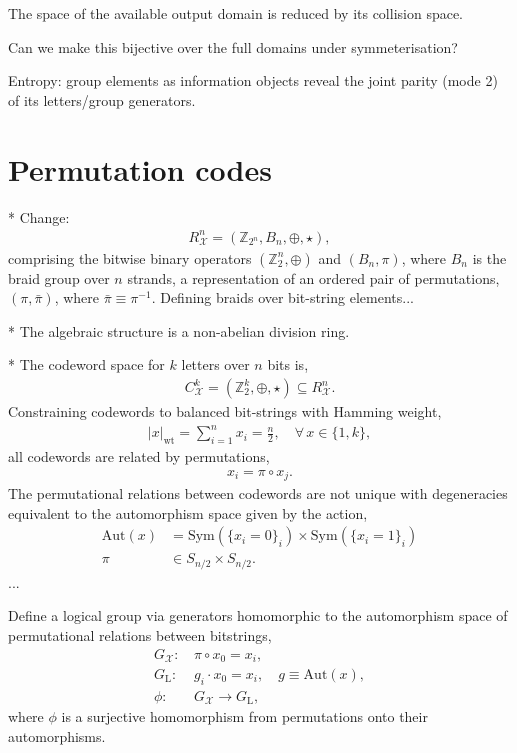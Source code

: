 \documentclass[twocolumn, aps, amsmath, amssymb, nofootinbib, superscriptaddress, longbibliography, doublefloatfix, table-of-contents, eqsecnum, rmp]{revtex4-2}
\begin{document}
The space of the available output domain is reduced by its collision space.

Can we make this bijective over the full domains under symmeterisation?

Entropy: group elements as information objects reveal the joint parity (mode 2) of its letters/group generators.


\section{Permutation codes}

* Change:
\begin{align}
	R_\mathcal{X}^n = (\mathbb{Z}_{2^n}, B_n, \oplus, \star),
\end{align}
comprising the bitwise binary operators $(\mathbb{Z}_2^n,\oplus)$ and $(B_n,\pi)$, where $B_n$ is the braid group over $n$ strands, a representation of an ordered pair of permutations, $(\pi,\bar{\pi})$, where $\bar{\pi}\equiv \pi^{-1}$. Defining braids over bit-string elements...

* The algebraic structure is a non-abelian division ring.

* The codeword space for $k$ letters over $n$ bits is,
\begin{align}
	C_\mathcal{X}^k = (\mathbb{Z}_2^k,\oplus,\star) \subseteq R_\mathcal{X}^n.
\end{align}
Constraining codewords to balanced bit-strings with Hamming weight,
\begin{align}
	|x|_\mathrm{wt} = \sum_{i=1}^n x_i = \frac{n}{2},\quad\forall\, x\in\{1,k\},
\end{align}
all codewords are related by permutations,
\begin{align}
	x_i = \pi \circ x_j.
\end{align}
The permutational relations between codewords are not unique with degeneracies equivalent to the automorphism space given by the action,
\begin{align}
	\mathrm{Aut}(x) &= \mathrm{Sym}(\{x_i=0\}_i) \times \mathrm{Sym}(\{x_i=1\}_i)\nonumber\\
	\pi &\in S_{n/2} \times S_{n/2}.
\end{align}
...

Define a logical group via generators homomorphic to the automorphism space of permutational relations between bitstrings,
\begin{align}
	G_\mathcal{X}:\, &\pi\circ x_0 = x_i, \nonumber\\
	G_\mathrm{L}:\, &g_i \cdot x_0 = x_i,\quad g\equiv \mathrm{Aut}(x),\nonumber\\
	\phi:\, & G_\mathcal{X} \to G_\mathrm{L},
\end{align}
where $\phi$ is a surjective homomorphism from permutations onto their automorphisms.
\end{document}
